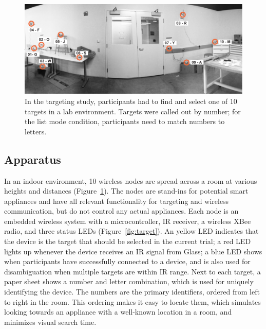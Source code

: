 \documentclass{sigchi}
\begin{document}
\begin{figure}[t]
\centering
\includegraphics[width=1.0\columnwidth]{figures/targeting-study-layout.pdf}
\caption{In the targeting study, participants had to find and select one of 10 targets in a lab environment. Targets were called out by number; for the list mode condition, participants need to match numbers to letters.}
\label{fig:targeting-study-layout}
\end{figure}

\subsection{Apparatus}
In an indoor environment, 10 wireless nodes are spread across a room at various heights and distances (Figure~\ref{fig:targeting-study-layout}). The nodes are stand-ins for potential smart appliances and have all relevant functionality for targeting and wireless communication, but do not control any actual appliances. Each node is an embedded wireless system with a microcontroller, IR receiver, a wireless XBee radio, and three status LEDs (Figure~\ref{fig:target}). An yellow LED indicates that the device is the target that should be selected in the current trial; a red LED lights up whenever the device receives an IR signal from Glass; a blue LED shows when participants have successfully connected to a device, and is also used for disambiguation when multiple targets are within IR range. Next to each target, a paper sheet shows a number and letter combination, which is used for uniquely identifying the device. The numbers are the primary identifiers, ordered from left to right in the room. This ordering makes it easy to locate them, which simulates looking towards an appliance with a well-known location in a room, and minimizes visual search time.
\end{document}
